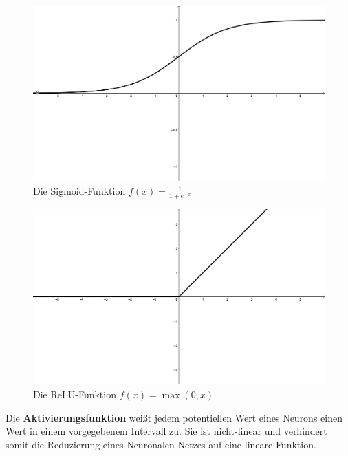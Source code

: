 \begin{figure}
    \centering
    \includegraphics[width=\textwidth]{zeichnungen/sigmoid.png}
    \caption{Die Sigmoid-Funktion $f(x) = \frac{1}{1+e^{-x}}$}\label{img:sigmoid}
\end{figure}

\begin{figure}
    \centering
    \includegraphics[width=\textwidth]{zeichnungen/relu.png}
    \caption{Die ReLU-Funktion $f(x) = \max(0,x)$}\label{img:relu}
\end{figure}

\begin{definition}\label{def:aktivierungsfunktion}
    Die \textbf{Aktivierungsfunktion} weißt jedem potentiellen Wert eines Neurons einen Wert in einem vorgegebenem Intervall zu.
    Sie ist nicht-linear und verhindert somit die Reduzierung eines Neuronalen Netzes auf eine lineare Funktion.
\end{definition}

